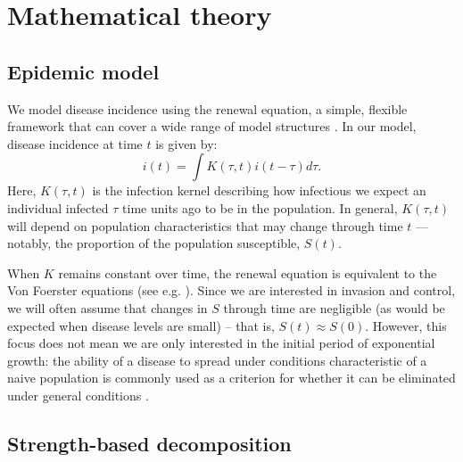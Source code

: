 \documentclass[12pt]{article}
\begin{document}
\section{Mathematical theory}

\subsection{Epidemic model}

We model disease incidence using the renewal equation, a simple, flexible framework that can cover a wide range of model structures \citep{heesterbeek1996concept, diekmann2000mathematical, roberts2004modelling, aldis2005integral, wallinga2007generation, roberts2007model, Champredon2018equivalence}.
In our model, disease incidence at time $t$ is given by:
\begin{equation}
i(t) = \int K(\tau, t) i(t-\tau) d\tau.
\end{equation}
Here, $K(\tau, t)$ is the infection kernel describing how infectious we expect an individual infected $\tau$ time units ago to be in the population.
In general, $K(\tau, t)$ will depend on population characteristics that may change through time $t$ --- notably, the proportion of the population susceptible, $S(t)$.

When $K$ remains constant over time, the renewal equation is equivalent to the Von Foerster equations (see e.g. \cite{fraser2004factors}).
Since we are interested in invasion and control, we will often assume that changes in $S$ through time are negligible (as would be expected when disease levels are small) -- that is, $S(t) \approx S(0)$.
However, this focus does not mean we are only interested in the initial period of exponential growth: the ability of a disease to spread under conditions characteristic of a naive population is commonly used as a criterion for whether it can be eliminated under general conditions \citep{anderson1985vaccination,fraser2004factors}.

\subsection{Strength-based decomposition}
\end{document}
